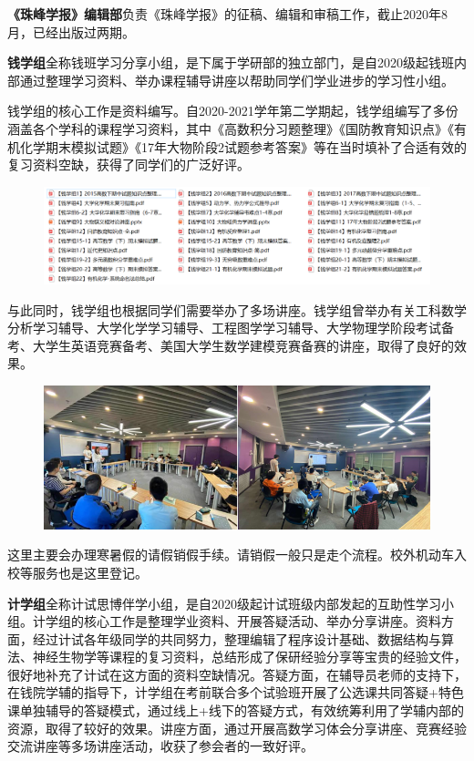 \documentclass[
decoration,  %
]{qyxf-book}
\begin{document}
	\textbf{《珠峰学报》编辑部}负责《珠峰学报》的征稿、编辑和审稿工作，截止2020年8月，已经出版过两期。
	
	\textbf{钱学组}全称钱班学习分享小组，是下属于学研部的独立部门，是自2020级起钱班内部通过整理学习资料、举办课程辅导讲座以帮助同学们学业进步的学习性小组。
	
	钱学组的核心工作是资料编写。自2020-2021学年第二学期起，钱学组编写了多份涵盖各个学科的课程学习资料，其中《高数积分习题整理》《国防教育知识点》《有机化学期末模拟试题》《17年大物阶段2试题参考答案》等在当时填补了合适有效的复习资料空缺，获得了同学们的广泛好评。

	
	\begin{figure}[h]
		\centering
		\includegraphics[width=0.6\linewidth]{pics/qianxuezu01.png}
	\end{figure}
	
	与此同时，钱学组也根据同学们需要举办了多场讲座。钱学组曾举办有关工科数学分析学习辅导、大学化学学习辅导、工程图学学习辅导、大学物理学阶段考试备考、大学生英语竞赛备考、美国大学生数学建模竞赛备赛的讲座，取得了良好的效果。
	
	\begin{figure}[h]
		\centering
		\includegraphics[width=0.6\linewidth]{pics/qianxuezu02.png}
	\end{figure}
	
	这里主要会办理寒暑假的请假销假手续。请销假一般只是走个流程。校外机动车入校等服务也是这里登记。

	\textbf{计学组}全称计试思博伴学小组，是自2020级起计试班级内部发起的互助性学习小组。计学组的核心工作是整理学业资料、开展答疑活动、举办分享讲座。资料方面，经过计试各年级同学的共同努力，整理编辑了程序设计基础、数据结构与算法、神经生物学等课程的复习资料，总结形成了保研经验分享等宝贵的经验文件，很好地补充了计试在这方面的资料空缺情况。答疑方面，在辅导员老师的支持下，在钱院学辅的指导下，计学组在考前联合多个试验班开展了公选课共同答疑+特色课单独辅导的答疑模式，通过线上+线下的答疑方式，有效统筹利用了学辅内部的资源，取得了较好的效果。讲座方面，通过开展高数学习体会分享讲座、竞赛经验交流讲座等多场讲座活动，收获了参会者的一致好评。
\end{document}
